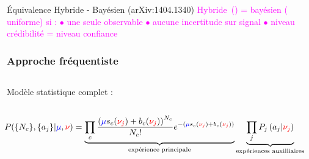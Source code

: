 \begin{frame}
\begin{small}
\begin{block}{\'Equivalence Hybride - Bay\'esien (arXiv:1404.1340)}
\textcolor{magenta}{Hybride~(\CLs) = bayésien ( uniforme) si : $\bullet$ une seule observable}
\textcolor{magenta}{ $\bullet$ aucune incertitude sur signal}
\textcolor{magenta}{ $\bullet$ niveau cr\'edibilit\'e = niveau confiance}
\end{block}
\end{small}

\end{frame}

\begin{frame}
\frametitle{Approche fréquentiste}
\begin{small}

\begin{columns}
\begin{column}{0.6\textwidth}
\qquad Mod\`ele statistique complet :
\end{column}
\begin{column}{0.5\textwidth}
\end{column}
\end{columns}

\begin{block}{}
\[
\hspace*{-0.5cm}
P(\{\nc\},\{a_j\}|\textcolor{blue}{\mu},\textcolor{red}{\nu})=\underbrace{\prod\limits_c\frac{\left(\textcolor{blue}{\mu} \scc(\textcolor{red}{\nu_j})+\bc(\textcolor{red}{\nu_j})\right)^{\nc}}{\nc!}e^{-\left(\textcolor{blue}{\mu} \scc(\textcolor{red}{\nu_j})+\bc(\textcolor{red}{\nu_j})\right)}}_{\text{expérience principale}}\underbrace{\prod_j P_j\left(a_j|\textcolor{red}{\nu_j}\right)}_{\text{expériences auxilliaires}}\]
\end{block}
\end{small}


\end{frame}
